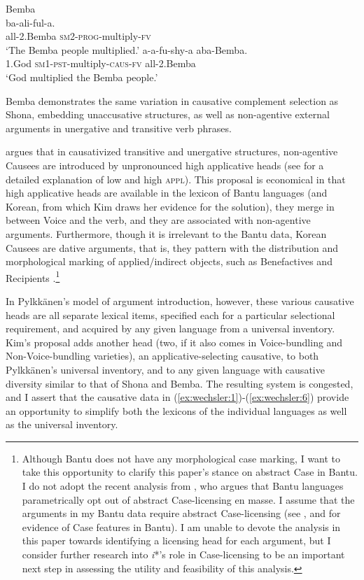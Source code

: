 \documentclass[output=paper,modfonts,nonflat,colorlinks,citecolor=brown]{langsci/langscibook}
\begin{document}
\ea\label{ex:wechsler:6}
Bemba \citep[155]{Givón1969}\\
\ea
{}  {{ba-ali-ful-a}}.  \\
 {all-2.Bemba}   {\textsc{sm2}{}-\textsc{prog}{}-multiply-\textsc{fv}}  \\
\glt `The Bemba people multiplied.'
\ex
{}  {{a-a-fu-shy-a} }  {{aba-Bemba}}.\\
1.God  {\textsc{sm1-pst}{}-multiply-\textsc{caus}{}-\textsc{fv}}  {all-2.Bemba}\\
\glt `God multiplied the Bemba people.'
\z
\z

Bemba demonstrates the same variation in causative complement selection as Shona, embedding unaccusative structures, as well as non-agentive external arguments in unergative and transitive verb phrases.


\citet{Kim2011thesis} argues that in causativized transitive and unergative structures, non-agentive Causees are introduced by unpronounced high applicative heads (see  for a detailed explanation of low and high \textsc{appl).} This proposal is economical in that high applicative heads are available in the lexicon of Bantu languages (and Korean, from which Kim draws her evidence for the solution), they merge in between Voice and the verb, and they are associated with non-agentive arguments. Furthermore, though it is irrelevant to the Bantu data, Korean Causees are dative arguments, that is, they pattern with the distribution and morphological marking of applied/indirect objects, such as Benefactives and Recipients \citep{Kim2011thesis}.\footnote{{Although Bantu does not have any morphological case marking, I want to take this opportunity to clarify this paper's stance on abstract Case in Bantu. I do not adopt the recent analysis from} {\citet{Diercks2012}, who argues that Bantu languages parametrically opt out of abstract Case-licensing en masse. I assume that the arguments in my Bantu data require abstract Case-licensing (see} \citealt{vanderWal2015,SheehanvanderWal2016,Halpert2012}, and \citealt{Wechsler2014,Wechsler2016} for evidence of Case features in Bantu). I am unable to devote the analysis in this paper towards identifying a licensing head for each argument, but I consider further research into \textit{i}*’s role in Case-licensing to be an important next step in assessing the utility and feasibility of this analysis.}


In Pylkkänen’s model of argument introduction, however, these various causative heads are all separate lexical items, specified each for a particular selectional requirement, and acquired by any given language from a universal inventory. Kim’s proposal adds another head (two, if it also comes in Voice-bundling and Non-Voice-bundling varieties), an applicative-selecting causative, to both Pylkkänen’s universal inventory, and to any given language with causative diversity similar to that of Shona and Bemba. The resulting system is congested, and I assert that the causative data in (\ref{ex:wechsler:1})-(\ref{ex:wechsler:6}) provide an opportunity to simplify both the lexicons of the individual languages as well as the universal inventory.
\end{document}
